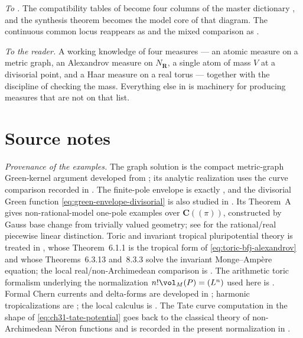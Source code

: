 \emph{To .}  The compatibility tables of
 become four columns of the master dictionary
, and the synthesis theorem
 becomes the model core
 of that diagram.  The continuous common locus
reappears as  and the mixed
comparison as .

\emph{To the reader.}  A working knowledge of four measures --- an atomic
measure on a metric graph, an Alexandrov measure on $N_\mathbf R$, a
single atom of mass $V$ at a divisorial point, and a Haar measure on a real
torus --- together with the discipline of checking the mass.  Everything
else in  is machinery for producing measures that are not on
that list.

\section*{Source notes}

\emph{Provenance of the examples.}  The graph solution
 is the compact metric-graph Green-kernel
argument developed from ; its analytic realization
uses the curve comparison recorded in .  The finite-pole
envelope  is exactly
\cite[Lemma~8.5 and Proposition~8.6]{BFJ15}, and the divisorial Green function
\eqref{eq:green-envelope-divisorial} is also studied in \cite{BJGreen24}.
Its Theorem~A gives non-rational-model one-pole examples over
$\mathbf C((\pi))$, constructed by Gauss base change from trivially
valued geometry; see  for the rational/real
piecewise linear distinction.  Toric and invariant tropical pluripotential theory is
treated in \cite{BGJKK25}, whose Theorem~6.1.1 is the tropical form of
\eqref{eq:toric-bfj-alexandrov} and whose Theorems~6.3.13 and~8.3.3 solve
the invariant Monge--Amp\`ere equation; the local real/non-Archimedean
comparison is \cite{Vil20}.  The arithmetic toric formalism underlying the
normalization $n!\vol_M(P)=(L^n)$ used here is
\cite{BGPS14}.  Formal Chern currents and delta-forms are developed in
\cite{GK17,GK19}; harmonic tropicalizations are \cite{GJR26}; the local
calculus is \cite{CLD25}.  The Tate curve computation in the shape of
\eqref{eq:ch31-tate-potential} goes back to the classical theory of
non-Archimedean N\'eron functions and is recorded in the present
normalization in .

